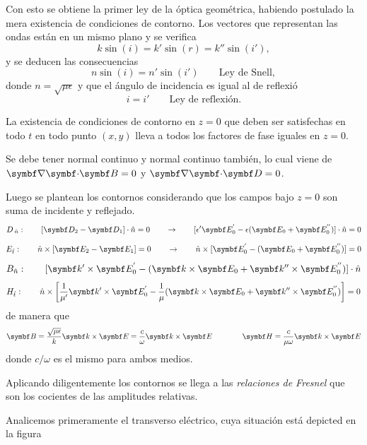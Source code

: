 \documentclass[10pt,oneside]{CBFT_book}
\begin{document}
Con esto se obtiene la primer ley de la óptica geométrica, habiendo postulado la mera
existencia de condiciones de contorno. Los vectores que representan las ondas están
en un mismo plano y se verifica
\[
	k \sin(i) = k' \sin(r) = k'' \sin(i'),
\]
y se deducen las consecuencias
\[
	n \sin (i) = n' \sin(i') \qquad \text{Ley de Snell},
\]
donde $n = \sqrt{\mu \epsilon}$ y que el ángulo de incidencia es igual al de reflexió
\[
	i = i' \qquad \text{Ley de reflexión}.
\]

La existencia de condiciones de contorno en $z=0$ que deben ser satisfechas en todo $t$ 
en todo punto $(x,y)$ lleva a todos los factores de fase iguales en $z=0$. 

Se debe tener  normal continuo y  normal continuo también, lo 
cual viene de $\divem{B}=0$ y $\divem{D}=0$.


Luego se plantean los contornos considerando que los campos bajo $z=0$ son suma de
incidente y reflejado.
\[
	D_{\nver} : \qquad [ \vb{D}_2 - \vb{D}_1 ]\cdot\hat{n} = 0 \qquad \rightarrow  \qquad 
		[ \epsilon'\vb{E}_0^{'} - \epsilon (\vb{E}_0 + \vb{E}_0^{''} )  ]\cdot\hat{n} = 0
\]
\[
	E_{\hat{t}} : \qquad \hat{n} \times [ \vb{E}_2 - \vb{E}_1 ] = 0 \qquad \rightarrow \qquad 
		\hat{n} \times [ \vb{E}_0^{'} - (\vb{E}_0 + \vb{E}_0^{''} )  ]  = 0
\]
\[
	B_{\hat{n}} : \qquad  [ \vb{k}' \times \vb{E}_0^{'} - ( \vb{k} \times \vb{E}_0 + 
			\vb{k}'' \times \vb{E}_0^{''} )  ]\cdot\hat{n} 
\]
\[
	H_{\hat{t}} : \qquad  \hat{n} \times \left[ \frac{1}{\mu'}\vb{k}' \times \vb{E}_0^{'} - 
			\frac{1}{\mu}( \vb{k} \times \vb{E}_0 + \vb{k}'' \times \vb{E}_0^{''} ) \right]  = 0
\]
de manera que 
\[
	\vb{B} = \frac{\sqrt{\mu\epsilon}}{k} \pv{k}{E} = \frac{c}{\omega} \pv{k}{E} \qquad \qquad 
	\vb{H} = \frac{c}{\mu \omega } \pv{k}{E}
\]
donde $c/\omega$ es el mismo para ambos medios.

Aplicando diligentemente los contornos se llega a las {\it relaciones de Fresnel} que son los cocientes de las 
amplitudes relativas.


Analicemos primeramente el transverso eléctrico, cuya situación está depicted en la figura
\end{document}
